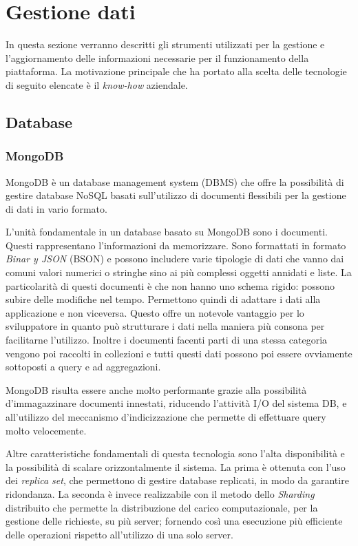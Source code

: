 \section{Gestione dati}
In questa sezione verranno descritti gli strumenti utilizzati per la gestione e l'aggiornamento delle informazioni
necessarie per il funzionamento della piattaforma.
La motivazione principale che ha portato alla scelta delle tecnologie di seguito elencate è il \textit{know-how} aziendale.

\subsection{Database}
\subsubsection{MongoDB}
MongoDB\cite{MongoDB} è un database management system (DBMS) che offre la possibilità di gestire database NoSQL
basati sull'utilizzo di documenti flessibili per la gestione di dati in vario formato.\cite{IBM-MongoDB}

L'unità fondamentale in un database basato su MongoDB sono i documenti. Questi rappresentano l'informazioni da memorizzare.
Sono formattati in formato \textit{Binar y JSON} (BSON) e possono includere varie tipologie di dati che vanno dai comuni
valori numerici o stringhe sino ai più complessi oggetti annidati e liste.
La particolarità di questi documenti è che non hanno uno schema rigido: possono subire delle modifiche nel tempo.
Permettono quindi di adattare i dati alla applicazione e non viceversa.
Questo offre un notevole vantaggio per lo sviluppatore in quanto può strutturare i dati nella maniera più consona per facilitarne l'utilizzo.
Inoltre i documenti facenti parti di una stessa categoria vengono poi raccolti in collezioni e tutti questi dati possono poi essere ovviamente sottoposti a query e ad aggregazioni.

MongoDB risulta essere anche molto performante grazie alla possibilità d'immagazzinare documenti innestati, riducendo l'attività I/O del sistema DB,
e all'utilizzo del meccanismo d'indicizzazione che permette di effettuare query molto velocemente.

Altre caratteristiche fondamentali di questa tecnologia sono l'alta disponibilità e la possibilità di scalare orizzontalmente il sistema.
La prima è ottenuta con l'uso dei \textit{replica set}, che permettono di gestire database replicati, in modo da garantire ridondanza.
La seconda è invece realizzabile con il metodo dello \textit{Sharding} distribuito che permette
la distribuzione del carico computazionale, per la gestione delle richieste, su più server; fornendo così una esecuzione più efficiente delle operazioni rispetto all'utilizzo di una solo server.


